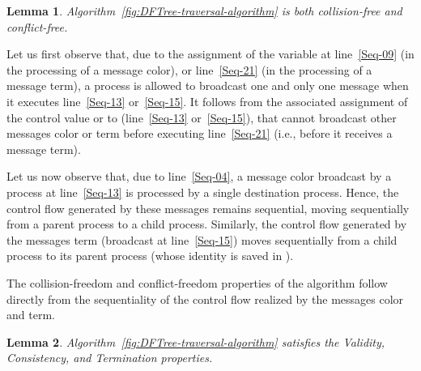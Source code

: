\documentclass[11pt,english]{article}
\newtheorem{lemma}{Lemma}
\newcommand{\toto}{xxx}
\newenvironment{proofL}{\noindent{\bf
Proof }} {\hspace*{\fill}\par\vspace{3mm}}
\begin{document}
\begin{lemma}
\label{collision-conflict-freedom}
Algorithm~{\em\ref{fig:DFTree-traversal-algorithm}} is 
both collision-free and conflict-free. 
\end{lemma}


\begin{proofL}
Let us first observe that, due to the assignment of the variable 
 at line~\ref{Seq-09} (in the processing of a message 
{\sc color}),  or line~\ref{Seq-21}  (in the processing of a message 
{\sc term}), a process  is allowed to  broadcast one and only 
one message  when it executes line~\ref{Seq-13} or~\ref{Seq-15}.
It follows from the associated assignment of the control value  or  to 
 (line~\ref{Seq-13} or~\ref{Seq-15}), that   cannot broadcast 
other messages {\sc color} or {\sc term}  before executing
line~\ref{Seq-21} (i.e., before it receives a message {\sc term}).

Let us now observe that, due to line~\ref{Seq-04}, a message 
{\sc color} broadcast by a process at line~\ref{Seq-13}
is processed by a single destination  process. 
Hence, the control flow generated by these messages remains sequential, moving 
sequentially from a parent process to a child process. 
Similarly, the  control flow generated by the messages {\sc term} 
(broadcast at line~\ref{Seq-15}) moves sequentially from a child  process 
to its  parent process (whose identity is saved in ). 


The collision-freedom and conflict-freedom properties of the algorithm follow
directly from the sequentiality of the control flow realized by the messages
{\sc color} and {\sc term}.
\renewcommand{\toto}{collision-conflict-freedom}
\end{proofL}

\begin{lemma}
\label{lemma-three-properties}
Algorithm~{\em\ref{fig:DFTree-traversal-algorithm}} satisfies the 
Validity, Consistency, and Termination properties. 
\end{lemma}
\end{document}
